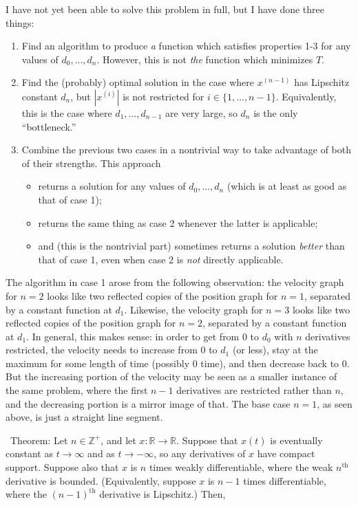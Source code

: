 \documentclass{article}
\newcommand{\abs}[1]{\left\vert #1 \right\vert}
\begin{document}
I have not yet been able to solve this problem in full,
but I have done three things:
\begin{enumerate}
  \item
    Find an algorithm to produce \textit{a} function
    which satisfies properties 1-3 for any values of $d_0, \ldots, d_n$.
    However, this is not \textit{the} function which minimizes $T$.
  \item
    Find the (probably) optimal solution
    in the case where $x^{(n-1)}$ has Lipschitz constant $d_n$,
    but $\abs{x^{(i)}}$ is not restricted for $i \in \{1, \ldots, n-1\}$.
    Equivalently, this is the case where $d_1, \ldots, d_{n-1}$ are very large,
    so $d_n$ is the only ``bottleneck.''
  \item
    Combine the previous two cases in a nontrivial way
    to take advantage of both of their strengths.
    This approach
    \begin{itemize}
    \item
      returns a solution for any values of $d_0, \ldots, d_n$
      (which is at least as good as that of case 1);
    \item
      returns the same thing as case 2 whenever the latter is applicable;
    \item
      and (this is the nontrivial part)
      sometimes returns a solution \textit{better} than that of case 1,
      even when case 2 is \textit{not} directly applicable.
    \end{itemize}
\end{enumerate}
The algorithm in case 1 arose from the following observation:
the velocity graph for $n=2$
looks like two reflected copies of the position graph for $n=1$,
separated by a constant function at $d_1$.
Likewise, the velocity graph for $n=3$
looks like two reflected copies of the position graph for $n=2$,
separated by a constant function at $d_1$.  
In general, this makes sense:
in order to get from $0$ to $d_0$ with $n$ derivatives restricted,
the velocity needs to increase from $0$ to $d_1$ (or less),
stay at the maximum for some length of time (possibly $0$ time),
and then decrease back to $0$.
But the increasing portion of the velocity
may be seen as a smaller instance of the same problem,
where the first $n-1$ derivatives are restricted rather than $n$,
and the decreasing portion is a mirror image of that.
The base case $n=1$, as seen above, is just a straight line segment.

\newpage

\newcommand{\norm}[1]{\left\Vert #1 \right\Vert}
\
Theorem: Let $n \in \mathbb{Z}^+$, and let $x : \mathbb{R} \rightarrow \mathbb{R}$.
Suppose that $x(t)$ is eventually constant as $t \rightarrow \infty$ and as $t \rightarrow -\infty$, so any derivatives of $x$ have compact support.
Suppose also that $x$ is $n$ times weakly differentiable,
where the weak $n^\text{th}$ derivative is bounded.
(Equivalently, suppose $x$ is $n-1$ times differentiable,
where the $(n-1)^\text{th}$ derivative is Lipschitz.)
Then,
\end{document}
